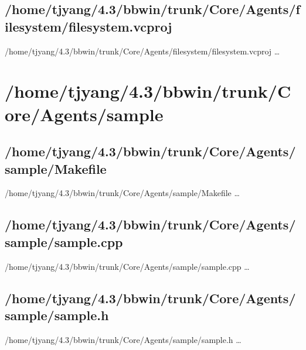 \subsection{/home/tjyang/4.3/bbwin/trunk/Core/Agents/filesystem/filesystem.vcproj}
\lstset{numberstyle=\tiny,numbers=left,
   breaklines=true,
   stepnumber=1,numbersep=5pt,firstnumber=1,
   xleftmargin=12pt,showstringspaces=false}
\noindent /home/tjyang/4.3/bbwin/trunk/Core/Agents/filesystem/filesystem.vcproj  \ldots



\section{/home/tjyang/4.3/bbwin/trunk/Core/Agents/sample}



\subsection{/home/tjyang/4.3/bbwin/trunk/Core/Agents/sample/Makefile}
\lstset{numberstyle=\tiny,numbers=left,
   breaklines=true,
   stepnumber=1,numbersep=5pt,firstnumber=1,
   xleftmargin=12pt,showstringspaces=false}
\noindent /home/tjyang/4.3/bbwin/trunk/Core/Agents/sample/Makefile  \ldots



\subsection{/home/tjyang/4.3/bbwin/trunk/Core/Agents/sample/sample.cpp}
\lstset{numberstyle=\tiny,numbers=left,
   breaklines=true,
   stepnumber=1,numbersep=5pt,firstnumber=1,
   xleftmargin=12pt,showstringspaces=false}
\noindent /home/tjyang/4.3/bbwin/trunk/Core/Agents/sample/sample.cpp  \ldots



\subsection{/home/tjyang/4.3/bbwin/trunk/Core/Agents/sample/sample.h}
\lstset{numberstyle=\tiny,numbers=left,
   breaklines=true,
   stepnumber=1,numbersep=5pt,firstnumber=1,
   xleftmargin=12pt,showstringspaces=false}
\noindent /home/tjyang/4.3/bbwin/trunk/Core/Agents/sample/sample.h  \ldots



